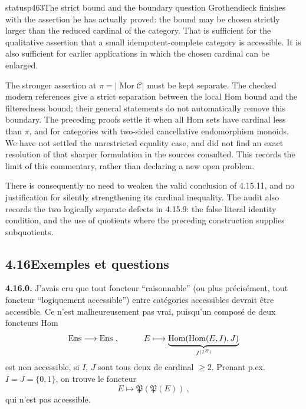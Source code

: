 \begin{dcomment}{status}{p463}{The strict bound and the boundary question}
Grothendieck finishes with the assertion he has actually proved: the bound may be chosen strictly larger than the reduced cardinal of the category. That is sufficient for the qualitative assertion that a small idempotent-complete category is accessible. It is also sufficient for earlier applications in which the chosen cardinal can be enlarged.

The stronger assertion at $\pi=|\operatorname{Mor}\mathcal C|$ must be kept separate. The checked modern references give a strict separation between the local Hom bound and the filteredness bound; their general statements do not automatically remove this boundary. The preceding proofs settle it when all Hom sets have cardinal less than $\pi$, and for categories with two-sided cancellative endomorphism monoids. We have not settled the unrestricted equality case, and did not find an exact resolution of that sharper formulation in the sources consulted. This records the limit of this commentary, rather than declaring a new open problem.

There is consequently no need to weaken the valid conclusion of 4.15.11, and no justification for silently strengthening its cardinal inequality. The audit also records the two logically separate defects in 4.15.9: the false literal identity condition, and the use of quotients where the preceding construction supplies subquotients.
\end{dcomment}


\subsection*{4.16\quad Exemples et questions}

\textbf{4.16.0.} J'avais cru que tout foncteur “raisonnable” (ou plus précisément, tout foncteur “logiquement accessible”) entre catégories accessibles devrait être accessible. Ce n'est malheureusement pas vrai, puisqu'un composé de deux foncteurs Hom
\[
\mathrm{Ens} \longrightarrow \mathrm{Ens}\ , \qquad\quad E \longmapsto \underbrace{\operatorname{Hom}(\operatorname{Hom}(E,I),J)}_{J^{(I^E)}}
\]
est non accessible, si $I$, $J$ sont tous deux de cardinal $\geqslant 2$. Prenant p.ex.\ $I = J = \{0,1\}$, on trouve le foncteur
\[
E \longmapsto \mathfrak{P}(\mathfrak{P}(E))\ ,
\]
qui n'est pas accessible.

